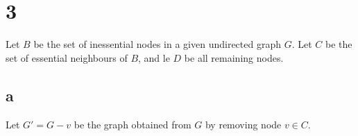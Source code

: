 \documentclass[letterpaper,12pt,oneside,onecolumn]{report}
\begin{document}
\section*{3}
Let $B$ be the set of inessential nodes in a given undirected graph $G$. Let $C$ be the set of essential neighbours of $B$, and le $D$ be all remaining nodes.
\subsection*{a}
Let $G' = G-v$ be the graph obtained from $G$ by removing node $v \in C$.
\end{document}
